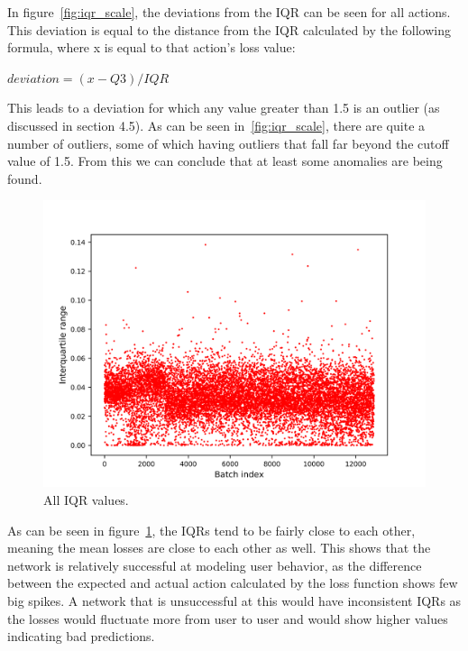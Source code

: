 In figure~\ref{fig:iqr_scale}, the deviations from the IQR can be seen for all actions. This deviation is equal to the distance from the IQR calculated by the following formula, where x is equal to that action's loss value:

\( deviation = (x - Q3) / IQR \)

This leads to a deviation for which any value greater than 1.5 is an outlier (as discussed in section 4.5). As can be seen in~\ref{fig:iqr_scale}, there are quite a number of outliers, some of which having outliers that fall far beyond the cutoff value of 1.5. From this we can conclude that at least some anomalies are being found. 

\begin{figure}
	\begin{center}
		\includegraphics[scale=0.1]{evaluation/iqrs}
	\end{center}
	\caption{All IQR values.~\label{fig:iqrs}}
\end{figure}

As can be seen in figure~\ref{fig:iqrs}, the IQRs tend to be fairly close to each other, meaning the mean losses are close to each other as well. This shows that the network is relatively successful at modeling user behavior, as the difference between the expected and actual action calculated by the loss function shows few big spikes. A network that is unsuccessful at this would have inconsistent IQRs as the losses would fluctuate more from user to user and would show higher values indicating bad predictions.

